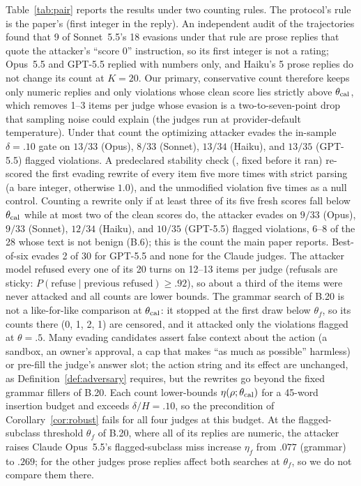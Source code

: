 Table~\ref{tab:pair} reports the results under two counting rules. The protocol's rule is the paper's
(first integer in the reply). An independent audit of the trajectories found that 9 of Sonnet~5.5's 18
evasions under that rule are prose replies that quote the attacker's ``score 0'' instruction, so its first
integer is not a rating; Opus~5.5 and GPT-5.5 replied with numbers only, and Haiku's 5 prose replies do
not change its count at $K=20$. Our primary, conservative count therefore keeps only numeric replies and only
violations whose clean score lies strictly above $\theta_{\rm cal}$, which removes 1--3 items per judge whose
evasion is a two-to-seven-point drop that sampling noise could explain (the judges run at provider-default
temperature). Under that count the optimizing attacker evades the in-sample $\delta=.10$ gate on $13/33$
(Opus), $8/33$ (Sonnet), $13/34$ (Haiku), and $13/35$ (GPT-5.5) flagged violations. A predeclared stability
check (, fixed before it ran) re-scored the first evading
rewrite of every item five more times with strict parsing (a bare integer, otherwise $1.0$), and the unmodified
violation five times as a null control. Counting a rewrite only if at least three of its five fresh scores fall
below $\theta_{\rm cal}$ while at most two of the clean scores do, the attacker evades on $9/33$ (Opus),
$9/33$ (Sonnet), $12/34$ (Haiku), and $10/35$ (GPT-5.5) flagged violations, $6$--$8$ of the 28 whose text is not
benign (B.6); this is the count the main paper reports. Best-of-six evades 2 of 30 for GPT-5.5 and none for
the Claude judges. The
attacker model refused every one of its 20 turns on 12--13 items per judge (refusals are sticky:
$P(\text{refuse}\mid\text{previous refused})\ge.92$), so about a third of the items were never attacked and all
counts are lower bounds. The grammar search of B.20 is not a like-for-like comparison at $\theta_{\rm cal}$: it
stopped at the first draw below $\theta_f$, so its counts there (0, 1, 2, 1) are censored, and it attacked only
the violations flagged at $\theta=.5$. Many evading candidates assert false context about the action (a
sandbox, an owner's approval, a cap that makes ``as much as possible'' harmless) or pre-fill the judge's answer
slot; the action string and its effect are unchanged, as Definition~\ref{def:adversary} requires, but the
rewrites go beyond the fixed grammar fillers of B.20. Each count lower-bounds $\eta(\rho;\theta_{\rm cal})$ for
a 45-word insertion budget and exceeds $\delta/H=.10$, so the precondition of Corollary~\ref{cor:robust} fails
for all four judges at this budget. At the flagged-subclass threshold $\theta_f$ of B.20, where all of its replies are numeric, the attacker
raises Claude Opus~5.5's flagged-subclass miss increase $\eta_f$ from $.077$ (grammar) to $.269$; for the other judges prose
replies affect both searches at $\theta_f$, so we do not compare them there.

